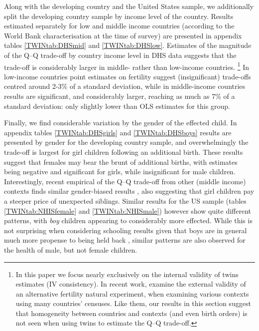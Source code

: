 \documentclass[subeqn]{article}
\begin{document}
\begin{spacing}{1.4}
Along with the developing country and the United States sample, we additionally
split the developing country sample by income level of the country.  Results
estimated separately for low and middle income countries (according to the
World Bank characterisation at the time of survey) are presented in appendix
tables \ref{TWINtab:DHSmid} and \ref{TWINtab:DHSlow}. Estimates of the magnitude
of the Q--Q trade-off by country income level in DHS data suggests that the
trade-off is considerably larger in middle- rather than low-income countries.%
\footnote{In this paper we focus nearly exclusively on the internal validity
  of twins estimates (IV consistency).  In recent work, \citet{Deheijaetal2015}
  examine the external validity of an alternative fertility natural experiment,
  when examining various contexts using many countries' censuses.  Like them,
  our results in this section suggest that homogeneity between countries and
  contexts (and even birth orders) is not seen when using twins to estimate the
  Q--Q trade-off.} In low-income countries point estimates on fertility suggest 
(insignificant) trade-offs centred around 2-3\% of a standard deviation, while 
in middle-income countries results are significant, and considerably larger,
reaching as much as 7\% of a standard deviation: only slightly lower than OLS 
estimates for this group.

Finally, we find considerable variation by the gender of the effected child.
In appendix tables \ref{TWINtab:DHSgirls} and \ref{TWINtab:DHSboys} results are
presented by gender for the developing country sample, and overwhelmingly the
trade-off is largest for girl children following an additional birth.  These
results suggest that females may bear the brunt of additional births, with
estimates being negative and significant for girls, while insignificant for male
children. Interestingly, recent empirical of the Q--Q trade-off from other (middle
income) contexts finds similar gender-biased results \citep{SouzaPonczek2012},
also suggesting that girl children pay a steeper price of unexpected siblings.
Similar results for the US sample (tables \ref{TWINtab:NHISfemale} and
\ref{TWINtab:NHISmale}) however show quite different patterns, with \emph{boy}
children appearing to considerably more effected. While this is not surprising
when considering schooling results given that boys are in general much more
propense to being held back \citet{Warrenetal2014}, similar patterns are also
observed for the health of male, but not female children.


\end{spacing}
\end{document}
